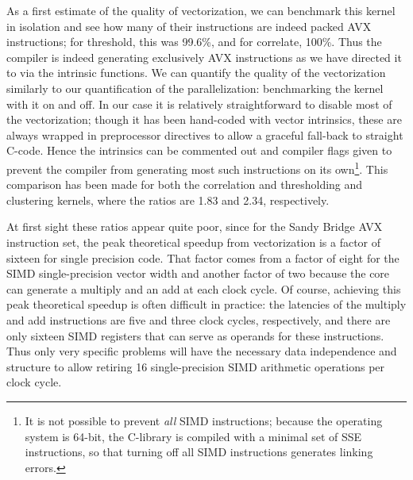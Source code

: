 As a first estimate of the quality of vectorization, we can benchmark this
kernel in isolation and see how many of their instructions are indeed packed
AVX instructions; for threshold, this was 99.6\%, and for correlate, 100\%. Thus
the compiler is indeed generating exclusively AVX instructions as we have
directed it to via the intrinsic functions.
We can quantify the quality of the vectorization similarly to our
quantification of the parallelization: benchmarking the kernel with it on and
off. In our case it is relatively straightforward to disable most of the
vectorization; though it has been hand-coded with vector intrinsics, these are
always wrapped in preprocessor directives to allow a graceful fall-back to
straight C-code.  Hence the intrinsics can be commented out and compiler flags
given to prevent the compiler from generating most such instructions on its
own\footnote{It is not possible to prevent \emph{all} SIMD instructions; because
  the operating system is 64-bit, the C-library is compiled with a minimal set
  of SSE instructions, so that turning off all SIMD instructions generates linking
  errors.}.
This comparison has been made for both the correlation and thresholding and
clustering kernels, where the ratios are 1.83 and 2.34, respectively. 

At first sight these ratios appear quite poor, since for the Sandy Bridge AVX
instruction set, the peak theoretical speedup from 
vectorization is a factor of sixteen for single precision code.  That factor
comes from a factor of eight for the SIMD single-precision vector width and
another factor of two because the core can generate a multiply and an add at
each clock cycle.  Of course, achieving this peak theoretical speedup is often
difficult in practice: the latencies of the multiply and add instructions are
five and three clock cycles, respectively, and there are only sixteen SIMD
registers that can serve as operands for these instructions. Thus only very
specific problems will have the necessary data independence and structure to
allow retiring 16 single-precision SIMD arithmetic operations per clock cycle.

